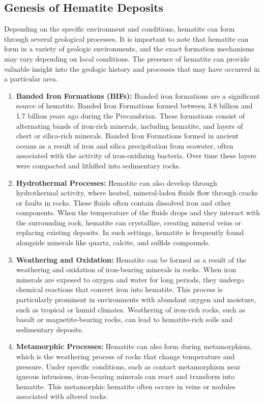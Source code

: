 \documentclass[12pt,a4paper, top=1.9cm, bottom=2.03cm, left=3.81cm, right=1.9cm]{article}
\begin{document}
\subsection{Genesis of Hematite Deposits}
\onehalfspacing
\noindent\fontsize{12}{14}\selectfont Depending on the specific environment and conditions, hematite can form through several geological processes. It is important to note that hematite can form in a variety of geologic environments, and the exact formation mechanisms may vary depending on local conditions. The presence of hematite can provide valuable insight into the geologic history and processes that may have occurred in a particular area.
\begin{enumerate}[label=\arabic*.]  %
    \item \textbf{Banded Iron Formations (BIFs):} Banded iron formations are a significant source of hematite. Banded Iron Formations formed between 3.8 billion and 1.7 billion years ago during the Precambrian. These formations consist of alternating bands of iron-rich minerals, including hematite, and layers of chert or silica-rich minerals. Banded Iron Formations formed in ancient oceans as a result of iron and silica precipitation from seawater, often associated with the activity of iron-oxidizing bacteria. Over time these layers were compacted and lithified into sedimentary rocks.
    \item \textbf{Hydrothermal Processes:} Hematite can also develop through hydrothermal activity, where heated, mineral-laden fluids flow through cracks or faults in rocks. These fluids often contain dissolved iron and other components. When the temperature of the fluids drops and they interact with the surrounding rock, hematite can crystallize, creating mineral veins or replacing existing deposits. In such settings, hematite is frequently found alongside minerals like quartz, calcite, and sulfide compounds.
    \item \textbf{Weathering and Oxidation:} Hematite can be formed as a result of the weathering and oxidation of iron-bearing minerals in rocks. When iron minerals are exposed to oxygen and water for long periods, they undergo chemical reactions that convert iron into hematite. This process is particularly prominent in environments with abundant oxygen and moisture, such as tropical or humid climates. Weathering of iron-rich rocks, such as basalt or magnetite-bearing rocks, can lead to hematite-rich soils and sedimentary deposits.
    \item \textbf{Metamorphic Processes:} Hematite can also form during metamorphism, which is the weathering process of rocks that change temperature and pressure. Under specific conditions, such as contact metamorphism near igneous intrusions, iron-bearing minerals can react and transform into hematite. This metamorphic hematite often occurs in veins or nodules associated with altered rocks.
\end{enumerate}
\end{document}
